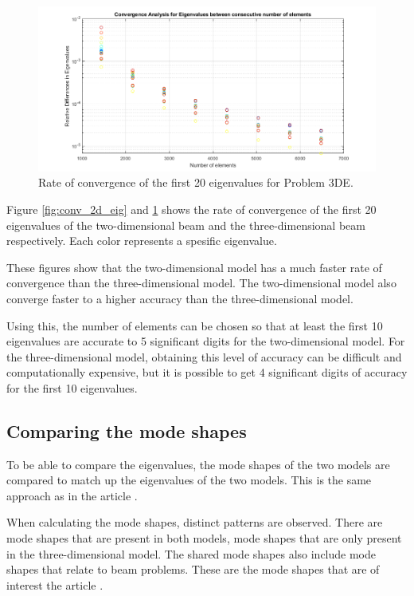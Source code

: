 \begin{figure}[H]
    \centering
    \begin{adjustbox}{center}
        \includegraphics[scale=0.7]{files/Chapter6/convergence3d.png}
    \end{adjustbox}
    \caption{Rate of convergence of the first 20 eigenvalues for Problem 3DE.}
    \label{fig:conv_3d_eig}
\end{figure}


Figure \ref{fig:conv_2d_eig} and \ref{fig:conv_3d_eig} shows the rate of convergence of the first 20 eigenvalues of the two-dimensional beam and the three-dimensional beam respectively. Each color represents a spesific eigenvalue.

These figures show that the two-dimensional model has a much faster rate of convergence than the three-dimensional model. The two-dimensional model also converge faster to a higher accuracy than the three-dimensional model.

Using this, the number of elements can be chosen so that at least the first 10 eigenvalues are accurate to 5 significant digits for the two-dimensional model. For the three-dimensional model, obtaining this level of accuracy can be difficult and computationally expensive, but it is possible to get 4 significant digits of accuracy for the first 10 eigenvalues.

\subsection{Comparing the mode shapes}
To be able to compare the eigenvalues, the mode shapes of the two models are compared to match up the eigenvalues of the two models. This is the same approach as in the article \cite{LVV09}.

When calculating the mode shapes, distinct patterns are observed. There are mode shapes that are present in both models, mode shapes that are only present in the three-dimensional model. The shared mode shapes also include mode shapes that relate to beam problems. These are the mode shapes that are of interest the article \cite{LVV09}.

